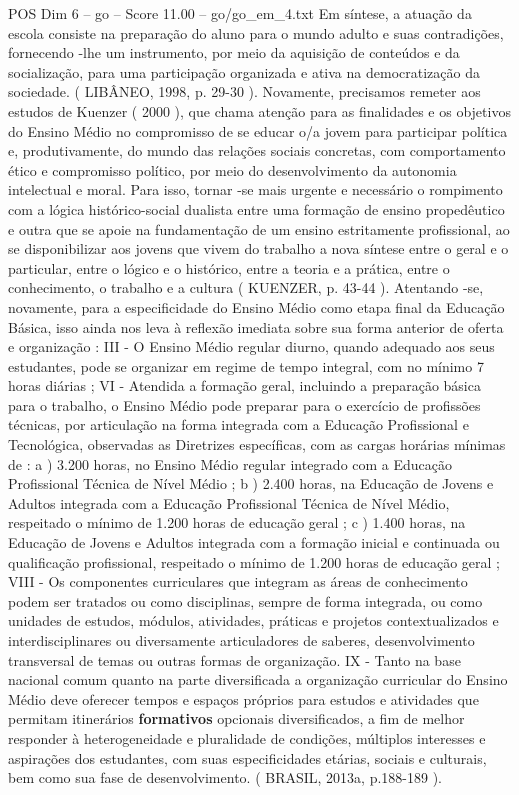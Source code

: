 \begin{textsample}{POS Dim 6 – go – Score 11.00 – go/go\_em\_4.txt}
Em síntese, a atuação da escola consiste na preparação do aluno para o mundo adulto e suas contradições, fornecendo -lhe um instrumento, por meio da aquisição de conteúdos e da socialização, para uma participação organizada e ativa na democratização da sociedade. ( LIBÂNEO, 1998, p. 29-30 ).
Novamente, precisamos remeter aos estudos de Kuenzer ( 2000 ), que chama atenção para as finalidades e os objetivos do Ensino Médio no compromisso de se educar o/a jovem para participar política e, produtivamente, do mundo das relações sociais concretas, com comportamento ético e compromisso político, por meio do desenvolvimento da autonomia intelectual e moral.
Para isso, tornar -se mais urgente e necessário o rompimento com a lógica histórico-social dualista entre uma formação de ensino propedêutico e outra que se apoie na fundamentação de um ensino estritamente profissional, ao se disponibilizar aos jovens que vivem do trabalho a nova síntese entre o geral e o particular, entre o lógico e o histórico, entre a teoria e a prática, entre o conhecimento, o trabalho e a cultura ( KUENZER, p. 43-44 ).
Atentando -se, novamente, para a especificidade do Ensino Médio como etapa final da Educação Básica, isso ainda nos leva à reflexão imediata sobre sua forma anterior de oferta e organização : III - O Ensino Médio regular diurno, quando adequado aos seus estudantes, pode se organizar em regime de tempo integral, com no mínimo 7 horas diárias ; VI - Atendida a formação geral, incluindo a preparação básica para o trabalho, o Ensino Médio pode preparar para o exercício de profissões técnicas, por articulação na forma integrada com a Educação Profissional e Tecnológica, observadas as Diretrizes específicas, com as cargas horárias mínimas de : a ) 3.200 horas, no Ensino Médio regular integrado com a Educação Profissional Técnica de Nível Médio ; b ) 2.400 horas, na Educação de Jovens e Adultos integrada com a Educação Profissional Técnica de Nível Médio, respeitado o mínimo de 1.200 horas de educação geral ; c ) 1.400 horas, na Educação de Jovens e Adultos integrada com a formação inicial e continuada ou qualificação profissional, respeitado o mínimo de 1.200 horas de educação geral ; VIII - Os componentes curriculares que integram as áreas de conhecimento podem ser tratados ou como disciplinas, sempre de forma integrada, ou como unidades de estudos, módulos, atividades, práticas e projetos contextualizados e interdisciplinares ou diversamente articuladores de saberes, desenvolvimento transversal de temas ou outras formas de organização.
IX - Tanto na base nacional comum quanto na parte diversificada a organização curricular do Ensino Médio deve oferecer tempos e espaços próprios para estudos e atividades que permitam itinerários \textbf{formativos} opcionais diversificados, a fim de melhor responder à heterogeneidade e pluralidade de condições, múltiplos interesses e aspirações dos estudantes, com suas especificidades etárias, sociais e culturais, bem como sua fase de desenvolvimento. ( BRASIL, 2013a, p.188-189 ).

\end{textsample}
